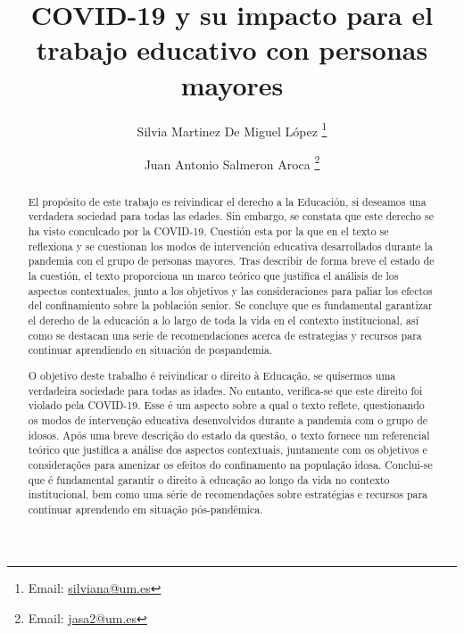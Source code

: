 \documentclass{textolivre}
\title{COVID-19 y su impacto para el trabajo educativo con personas mayores}
\author[1]{Silvia Martinez De Miguel López \orcid{0000-0001-7602-8796} \thanks{Email: \url{silviana@um.es}}}
\author[1]{Juan Antonio Salmeron Aroca \orcid{0000-0001-9482-2555} \thanks{Email: \url{jasa2@um.es}}}
\affil[1]{Universidad de Murcia. Facultad de 
Educación. Departamento de Teoría e Historia de la Educación, Murcia, España.}
\begin{document}
\maketitle

\begin{polyabstract}
\begin{abstract}
El propósito de este trabajo es reivindicar el derecho a la Educación, si deseamos una verdadera sociedad para todas las edades. Sin embargo, se constata que este derecho se ha visto conculcado por la COVID-19. Cuestión esta por la que en el texto se reflexiona y se cuestionan los modos de intervención educativa desarrollados durante la pandemia con el grupo de personas mayores. Tras describir de forma breve el estado de la cuestión, el texto proporciona un marco teórico que justifica el análisis de los aspectos contextuales, junto a los objetivos y las consideraciones para paliar los efectos del confinamiento sobre la población senior. Se concluye que es fundamental garantizar el derecho de la educación a lo largo de toda la vida en el contexto institucional, así como se destacan una serie de recomendaciones acerca de estrategias y recursos para continuar aprendiendo en situación de pospandemia.

\end{abstract}

\begin{portuguese}
\begin{abstract}
O objetivo deste trabalho é reivindicar o direito à Educação, se quisermos uma verdadeira sociedade para todas as idades. No entanto, verifica-se que este direito foi violado pela COVID-19. Esse é um aspecto sobre a qual o texto reflete, questionando os modos de intervenção educativa desenvolvidos durante a pandemia com o grupo de idosos. Após uma breve descrição do estado da questão, o texto fornece um referencial teórico que justifica a análise dos aspectos contextuais, juntamente com os objetivos e considerações para amenizar os efeitos do confinamento na população idosa. Conclui-se que é fundamental garantir o direito à educação ao longo da vida no contexto institucional, bem como uma série de recomendações sobre estratégias e recursos para continuar aprendendo em situação pós-pandêmica.

\end{abstract}
\end{portuguese}


\end{polyabstract}
\end{document}
